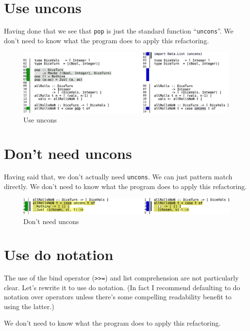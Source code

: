 \section{Use uncons}

Having done that we see that \texttt{pop} is just the standard function ``\texttt{uncons}''. We don't need to know what the program does to apply this refactoring.

\begin{figure}[htbp]
 \centering
 \includegraphics[width=\linewidth]{./pics/diff12.pdf}
 \caption{Use uncons}
 \label{fig:diff12}
\end{figure}

\section{Don't need uncons}


Having said that, we don't actually need \texttt{uncons}. We can just pattern match directly. We don't need to know what the program does to apply this refactoring.

\begin{figure}[htbp]
 \centering
 \includegraphics[width=\linewidth]{./pics/diff13.pdf}
 \caption{Don't need uncons}
 \label{fig:diff13}
\end{figure}

\section{Use do notation}

The use of the bind operator (\texttt{>>=}) and list comprehension are not particularly clear. Let's rewrite it to use do notation. (In fact I recommend defaulting to do notation over operators unless there's some compelling readability benefit to using the latter.)

We don't need to know what the program does to apply this refactoring.

